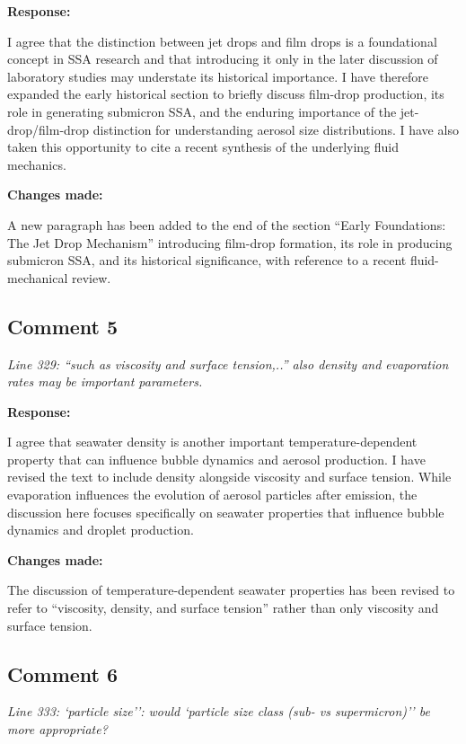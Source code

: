 \documentclass[11pt]{article}
\begin{document}
\textbf{Response:}

I agree that the distinction between jet drops and film drops is a foundational concept in SSA research and that introducing it only in the later discussion of laboratory studies may understate its historical importance. I have therefore expanded the early historical section to briefly discuss film-drop production, its role in generating submicron SSA, and the enduring importance of the jet-drop/film-drop distinction for understanding aerosol size distributions. I have also taken this opportunity to cite a recent synthesis of the underlying fluid mechanics.

\textbf{Changes made:}

A new paragraph has been added to the end of the section ``Early Foundations: The Jet Drop Mechanism'' introducing film-drop formation, its role in producing submicron SSA, and its historical significance, with reference to a recent fluid-mechanical review.

\subsection*{Comment 5}

\emph{Line 329: ``such as viscosity and surface tension,..'' also density and evaporation rates may be important parameters.}

\textbf{Response:}

I agree that seawater density is another important temperature-dependent property that can influence bubble dynamics and aerosol production. I have revised the text to include density alongside viscosity and surface tension. While evaporation influences the evolution of aerosol particles after emission, the discussion here focuses specifically on seawater properties that influence bubble dynamics and droplet production.

\textbf{Changes made:}

The discussion of temperature-dependent seawater properties has been revised to refer to ``viscosity, density, and surface tension'' rather than only viscosity and surface tension.

\subsection*{Comment 6}

\emph{Line 333: `particle size'': would `particle size class (sub- vs supermicron)'' be more appropriate?}
\end{document}
